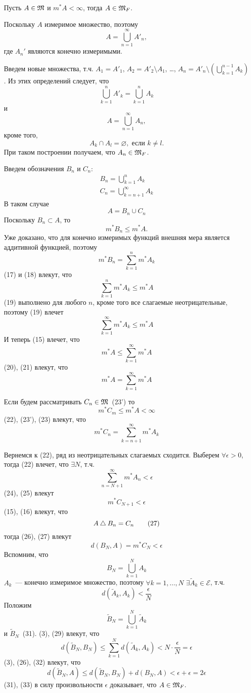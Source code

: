 \documentclass[main]{subfiles}
\begin{document}
\begin{theorem}
    Пусть $A \in \mathfrak{M}$ и $m^*A < \infty$, тогда $A \in \mathfrak{M}_F$.
\end{theorem}
\begin{longProof}
    Поскольку $A$ измеримое множество, поэтому
    \[A = \bigcup_{n=1}^\infty A'_n,\]
    где $A_n'$ являются конечно измеримыми.

    Введем новые множества, т.ч. $A_1 = A'_1$, $A_2 = A'_2 \setminus A_1$, \dots, $A_n = A'_n \setminus \left(\bigcup_{k=1}^{n-1} A_k\right)$.
    Из этих определений следует, что
    \[\bigcup_{k=1}^n A'_k = \bigcup_{k=1}^n A_k\]
    и
    \[A = \bigcup_{n=1}^\infty A_n, \tag{15}\]
    кроме того,
    \[A_k \cap A_l = \varnothing, \text{ если } k \neq l. \tag{16}\]
    При таком построении получаем, что $A_n \in \mathfrak{M}_F$.

    Введем обозначения $B_n$ и $C_n$:
    \begin{gather*}
        B_n = \bigcup_{k=1}^n A_k \\
        C_n = \bigcup_{k=n+1}^\infty A_k
    \end{gather*}
    В таком случае
    \[A = B_n \cup C_n\]
    Поскольку $B_n \subset A$, то
    \[m^* B_n \le m^* A. \tag{17}\]
    Уже доказано, что для конечно измеримых функций внешняя мера является аддитивной функцией, поэтому
    \[m^*B_n = \sum_{k=1}^{n} m^*A_k \tag{18}\]
    (17) и (18) влекут, что
    \[\sum_{k=1}^{n} m^* A_k \le m^* A \tag{19}\]
    (19) выполнено для любого $n$, кроме того все слагаемые неотрицательные, поэтому (19) влечет
    \[\sum_{k=1}^{\infty} m^*A_k \le m^* A \tag{20}\]
    И теперь (15) влечет, что
    \[m^* A \le \sum_{k=1}^{\infty} m^* A \tag{21}\]
    (20), (21) влекут, что
    \[m^* A = \sum_{k=1}^{\infty} m^* A \tag{22}\]

    Если будем рассматривать $C_n \in \mathfrak{M}$~(23') то
    \[m^* C_m \le m^* A < \infty\tag{23}\]
    (22), (23'), (23) влекут, что
    \[m^* C_n = \sum_{k=n+1}^{\infty} m^* A_k \tag{24}\]

    Вернемся к (22), ряд из неотрицательных слагаемых сходится.
    Выберем $\forall \epsilon >0$, тогда (22) влечет, что $\exists N$, т.ч.
    \[\sum_{n=N+1}^{\infty} m^*A_n < \epsilon \tag{25}\]
    (24), (25) влекут
    \[m^* C_{N+1} < \epsilon \tag{26}\]
    (15), (16) влекут, что
    \[A \mathbin{\triangle} B_n = C_n \tag{27}\]
    тогда (26), (27) влекут
    \[d(B_N, A) = m^* C_N < \epsilon \tag{28}\]
    Вспомним, что
    \[B_N = \bigcup_{k=1}^N A_k\]
    $A_k$~--- конечно измеримое множество, поэтому $\forall k = 1,\dotsc, N$ $\exists \widetilde{A}_k \in \mathcal{E}$, т.ч.
    \[d(\widetilde{A}_k, A_k) < \frac{\epsilon}{N} \tag{29}\]
    Положим
    \[\widetilde{B}_N = \bigcup_{k=1}^N \widetilde{A}_k \tag{30}\]
    и $\widetilde{B}_N$~(31).
    (3), (29) влекут, что
    \[d(\widetilde{B}_N, B_N) \le \sum_{k=1}^{N} d(\widetilde{A}_k, A_k) < N \cdot \frac{\epsilon}{N} = \epsilon \tag{32}\]
    (3), (26), (32) влекут, что
    \[d(\widetilde{B}_N, A) \le d(\widetilde{B}_N, B_N) + d(B_N, A) < \epsilon + \epsilon = 2\epsilon \tag{33}\]
    (31), (33) в силу произвольности $\epsilon$ доказывает, что $A \in \mathfrak{M}_F$.
\end{longProof}
\end{document}

